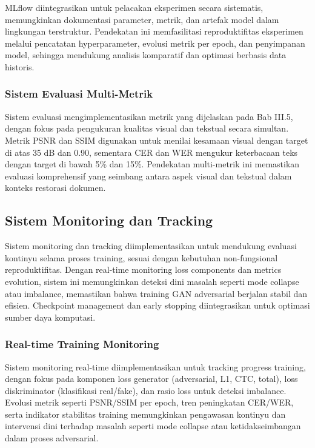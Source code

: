 \documentclass[12pt,a4paper]{article}
\begin{document}
MLflow diintegrasikan untuk pelacakan eksperimen secara sistematis, memungkinkan dokumentasi parameter, metrik, dan artefak model dalam lingkungan terstruktur. Pendekatan ini memfasilitasi reproduktifitas eksperimen melalui pencatatan hyperparameter, evolusi metrik per epoch, dan penyimpanan model, sehingga mendukung analisis komparatif dan optimasi berbasis data historis.

\subsubsection{Sistem Evaluasi Multi-Metrik}
\label{subsubsec:evaluasi-multi-metrik}

Sistem evaluasi mengimplementasikan metrik yang dijelaskan pada Bab III.5, dengan fokus pada pengukuran kualitas visual dan tekstual secara simultan. Metrik PSNR dan SSIM digunakan untuk menilai kesamaan visual dengan target di atas 35 dB dan 0.90, sementara CER dan WER mengukur keterbacaan teks dengan target di bawah 5\% dan 15\%. Pendekatan multi-metrik ini memastikan evaluasi komprehensif yang seimbang antara aspek visual dan tekstual dalam konteks restorasi dokumen.



\subsection{Sistem Monitoring dan Tracking}
\label{subsec:monitoring-tracking}

Sistem monitoring dan tracking diimplementasikan untuk mendukung evaluasi kontinyu selama proses training, sesuai dengan kebutuhan non-fungsional reproduktifitas. Dengan real-time monitoring loss components dan metrics evolution, sistem ini memungkinkan deteksi dini masalah seperti mode collapse atau imbalance, memastikan bahwa training GAN adversarial berjalan stabil dan efisien. Checkpoint management dan early stopping diintegrasikan untuk optimasi sumber daya komputasi.

\subsubsection{Real-time Training Monitoring}
\label{subsubsec:realtime-monitoring}

Sistem monitoring real-time diimplementasikan untuk tracking progress training, dengan fokus pada komponen loss generator (adversarial, L1, CTC, total), loss diskriminator (klasifikasi real/fake), dan rasio loss untuk deteksi imbalance. Evolusi metrik seperti PSNR/SSIM per epoch, tren peningkatan CER/WER, serta indikator stabilitas training memungkinkan pengawasan kontinyu dan intervensi dini terhadap masalah seperti mode collapse atau ketidakseimbangan dalam proses adversarial.
\end{document}
